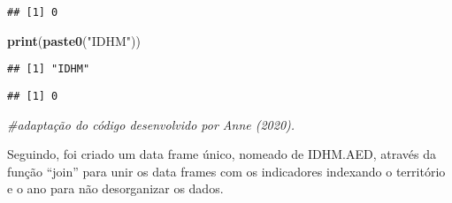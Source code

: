 \documentclass[
]{article}
\newenvironment{Shaded}{\begin{snugshade}}{\end{snugshade}}
\newcommand{\AttributeTok}[1]{\textcolor[rgb]{0.13,0.29,0.53}{#1}}
\newcommand{\CommentTok}[1]{\textcolor[rgb]{0.56,0.35,0.01}{\textit{#1}}}
\newcommand{\DecValTok}[1]{\textcolor[rgb]{0.00,0.00,0.81}{#1}}
\newcommand{\FunctionTok}[1]{\textcolor[rgb]{0.13,0.29,0.53}{\textbf{#1}}}
\newcommand{\NormalTok}[1]{#1}
\newcommand{\OtherTok}[1]{\textcolor[rgb]{0.56,0.35,0.01}{#1}}
\newcommand{\SpecialCharTok}[1]{\textcolor[rgb]{0.81,0.36,0.00}{\textbf{#1}}}
\newcommand{\StringTok}[1]{\textcolor[rgb]{0.31,0.60,0.02}{#1}}
\begin{document}
\begin{verbatim}
## [1] 0
\end{verbatim}

\begin{Shaded}
\begin{Highlighting}[]
\FunctionTok{print}\NormalTok{(}\FunctionTok{paste0}\NormalTok{(}\StringTok{"IDHM"}\NormalTok{))}
\end{Highlighting}
\end{Shaded}

\begin{verbatim}
## [1] "IDHM"
\end{verbatim}

\begin{Shaded}
\end{Shaded}

\begin{verbatim}
## [1] 0
\end{verbatim}

\begin{Shaded}
\begin{Highlighting}[]
\CommentTok{\#adaptação do código desenvolvido por Anne (2020).}
\end{Highlighting}
\end{Shaded}

Seguindo, foi criado um data frame único, nomeado de IDHM.AED, através
da função ``join'' para unir os data frames com os indicadores indexando
o território e o ano para não desorganizar os dados.
\end{document}

